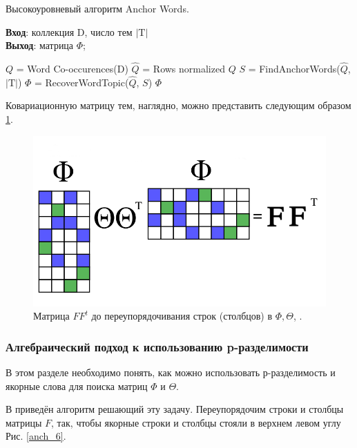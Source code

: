 \documentclass[a4paper, 14pt]{extarticle}
\begin{document}
   	\begin{singlespacing}
   		\begin{algorithm}
   		\caption{Высокоуровневый алгоритм Anchor Words.}
   		\label{plsa}
   			\textbf{Вход}: коллекция $\textrm{D}$, число тем $|\textrm{T}|$\\
   			\textbf{Выход}: матрица $\Phi$; 
   		\begin{algorithmic}[1]
   				\State $Q$ = Word Co-occurences($\textrm{D}$)
   				\State $\hat{Q}$ = Rows normalized $Q$
   				\State $S$ = FindAnchorWords($\hat{Q}$, $|\textrm{T}|$)
   				\State $\Phi$ = RecoverWordTopic($\hat{Q}$, $S$)
   				\State \Return $\Phi$
   		\end{algorithmic}
   		\end{algorithm}
   	\end{singlespacing} 
Ковариационную матрицу тем, наглядно, можно представить следующим образом \ref{anch_4}.   	
\begin{figure}[h]
		\centering \includegraphics[scale=0.45]{img/anch_5}  
		\caption{Матрица $FF^t$ до переупорядочивания строк (столбцов) в $\Phi, \Theta$, \cite{AnkurMoitraSlides}.}
		\label{anch_4}
\end{figure}

\subsubsection*{Алгебраический подход к использованию p-разделимости}
В этом разделе необходимо понять, как можно использовать р-разделимость и якорные слова для поиска матриц $\Phi$ и $\Theta$.

В \cite{Arora12} приведён алгоритм решающий эту задачу. Переупорядочим строки и столбцы матрицы $F$, так, чтобы якорные строки и столбцы стояли в верхнем левом углу Рис. \ref{anch_6}.
\end{document}
